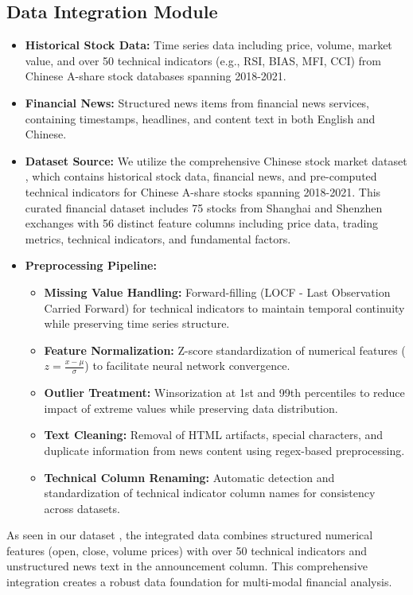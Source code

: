 \documentclass[3p,times,procedia]{elsarticle}
\begin{document}
\subsection{{Data Integration Module}}
\begin{itemize}

\item \textbf{Historical Stock Data:} Time series data including price, volume, market value, and over 50 technical indicators (e.g., RSI, BIAS, MFI, CCI) from Chinese A-share stock databases spanning 2018-2021.
\item \textbf{Financial News:} Structured news items from financial news services, containing timestamps, headlines, and content text in both English and Chinese.
\item \textbf{Dataset Source:} We utilize the comprehensive Chinese stock market dataset \cite{FinReportDataset2025}, which contains historical stock data, financial news, and pre-computed technical indicators for Chinese A-share stocks spanning 2018-2021. This curated financial dataset includes 75 stocks from Shanghai and Shenzhen exchanges with 56 distinct feature columns including price data, trading metrics, technical indicators, and fundamental factors.
\item \textbf{Preprocessing Pipeline:} 

\begin{itemize}
\item \textbf{Missing Value Handling:} Forward-filling (LOCF - Last Observation Carried Forward) for technical indicators to maintain temporal continuity while preserving time series structure.
\item \textbf{Feature Normalization:} Z-score standardization of numerical features ($z = \frac{x - \mu}{\sigma}$) to facilitate neural network convergence.
\item \textbf{Outlier Treatment:} Winsorization at 1st and 99th percentiles to reduce impact of extreme values while preserving data distribution.
\item \textbf{Text Cleaning:} Removal of HTML artifacts, special characters, and duplicate information from news content using regex-based preprocessing.
\item \textbf{Technical Column Renaming:} Automatic detection and standardization of technical indicator column names for consistency across datasets.
\end{itemize}
\end{itemize}

As seen in our dataset \cite{FinReportDataset2025}, the integrated data combines structured numerical features (open, close, volume prices) with over 50 technical indicators and unstructured news text in the announcement column. This comprehensive integration creates a robust data foundation for multi-modal financial analysis.
\end{document}
